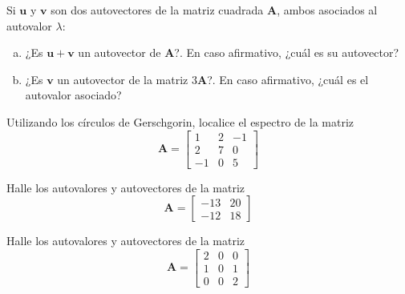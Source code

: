 \documentclass[11pt]{article}
\begin{document}
\begin{question} %
    Si $\bm{u}$ y $\bm{v}$ son dos autovectores de la matriz cuadrada $\bm{A}$, ambos asociados al autovalor $\lambda$:
    \begin{enumerate}[a)]
        \item ¿Es $\bm{u} + \bm{v}$ un autovector de $\bm{A}$?. En caso afirmativo, ¿cuál es su autovector?
        \item ¿Es $\bm{v}$ un autovector de la matriz $3 \bm{A}$?. En caso afirmativo, ¿cuál es el autovalor asociado?
    \end{enumerate}
\end{question}

\begin{question} %
    Utilizando los círculos de Gerschgorin, localice el espectro de la matriz
    \[ \bm{A} = 
        \begin{bmatrix}
            1 & 2 & -1 \\
            2 & 7 & 0 \\
            -1 & 0 & 5
        \end{bmatrix} \]
\end{question}

\begin{question} %
    Halle los autovalores y autovectores de la matriz
    \[ \bm{A} = \begin{bmatrix} -13 & 20 \\ -12 & 18 \end{bmatrix} \]
\end{question}


\begin{question} %
    Halle los autovalores y autovectores de la matriz
    \[ \bm{A} = \begin{bmatrix} 2 & 0 & 0 \\ 1 & 0 & 1 \\ 0 & 0 & 2 \end{bmatrix} \]
\end{question}
\end{document}
